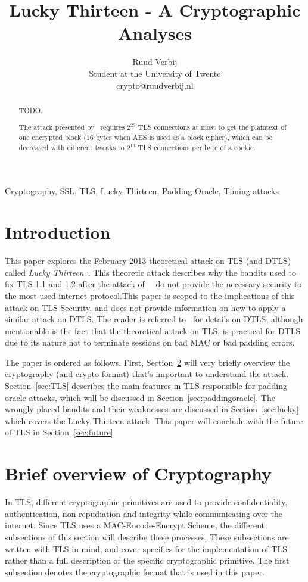 \documentclass[10pt,conference,a4paper]{IEEEtran}
\title{Lucky Thirteen - A Cryptographic Analyses}
\author{Ruud Verbij \\ Student at the University of Twente \\ crypto@ruudverbij.nl}
\begin{document}
\maketitle

\begin{abstract}
TODO. 

The attack presented by~\citeauthor{alfardan2013lucky} requires $2^{23}$ TLS connections at most to get the plaintext of one encrypted block ($16$ bytes when AES is used as a block cipher), which can be decreased with different tweaks to $2^{13}$ TLS connections per byte of a cookie.

\end{abstract}

\begin{IEEEkeywords}
Cryptography, SSL, TLS, Lucky Thirteen, Padding Oracle, Timing attacks
\end{IEEEkeywords}

\section{Introduction}
\label{sec:intro}
This paper explores the February 2013 theoretical attack on TLS (and DTLS) called \textit{Lucky Thirteen}~\cite{alfardan2013lucky}. This theoretic attack describes why the bandits used to fix TLS 1.1 and 1.2 after the attack of~\citeauthor{canvel2003password}~\cite{canvel2003password} do not provide the necessary security to the most used internet protocol.This paper is scoped to the implications of this attack on TLS Security, and does not provide information on how to apply a similar attack on DTLS. The reader is referred to~\cite{alfardan2013lucky} for details on DTLS, although mentionable is the fact that the theoretical attack on TLS, is practical for DTLS due to its nature not to terminate sessions on bad MAC or bad padding errors.

The paper is ordered as follows. First, Section~\ref{sec:crypto} will very briefly overview the cryptography (and crypto format) that's important to understand the attack. Section~\ref{sec:TLS} describes the main features in TLS responsible for padding oracle attacks, which will be discussed in Section~\ref{sec:paddingoracle}. The wrongly placed bandits and their weaknesses are discussed in Section~\ref{sec:lucky} which covers the Lucky Thirteen attack. This paper will conclude with the future of TLS in Section~\ref{sec:future}.

\section{Brief overview of Cryptography}
\label{sec:crypto}
In TLS, different cryptographic primitives are used to provide confidentiality, authentication, non-repudiation and integrity while communicating over the internet. Since TLS uses a MAC-Encode-Encrypt Scheme, the different subsections of this section will describe these processes. These subsections are written with TLS in mind, and cover specifics for the implementation of TLS rather than a full description of the specific cryptographic primitive. The first subsection denotes the cryptographic format that is used in this paper.
\end{document}
